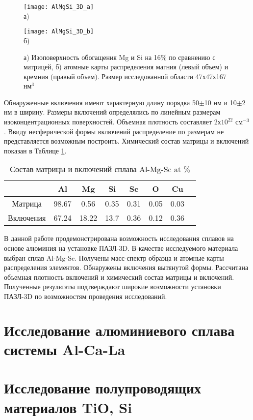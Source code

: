 \begin{figure}[htbp]
	\begin{minipage}[b][][b]{0.49\textwidth}\centering
		\texttt{[image: AlMgSi\_3D\_a]} \\ а)
	\end{minipage}
	\begin{minipage}[b][][b]{0.49\textwidth}\centering
		\texttt{[image: AlMgSi\_3D\_b]} \\ б)
	\end{minipage}
	\caption{а) Изоповерхность обогащения Mg и Si на 16$\%$ по сравнению с матрицей, б) атомные карты распределения магния (левый объем) и кремния (правый объем). Размер исследованной области 47х47х167 нм$^3$}
	\label{fig:AlMgSi_3D}
\end{figure} 

Обнаруженные включения имеют характерную длину порядка 50$\pm$10 нм и 10$\pm$2 нм в ширину. Размеры включений определялись по линейным размерам изоконцентрационных поверхностей. Объемная плотность составляет 2х$10^{22}$ см$^{-3}$. Ввиду несферической формы включений распределение по размерам не представляется возможным построить. Химический состав матрицы и включений показан в Таблице \cref{tab:AlMgSi_table}.

\begin{table} [htbp]
	\centering
		\caption{Состав матрицы и включений сплава Al-Mg-Sc at $\%$}%
		\label{tab:AlMgSi_table}%
		\begin{SingleSpace}
			\begin{tabular}{| c | c | c | c | c | c | c | c |}
				\hline
				  			& Al      & Mg     & Si    & Sc     & O     & Cu     \\ \hline
				Матрица     & 98.67   & 0.56   & 0.35  & 0.31   & 0.05  & 0.03   \\ \hline
				Включения   & 67.24   & 18.22  & 13.7  & 0.36   & 0.12  & 0.36   \\ \hline				
			\end{tabular}%
		\end{SingleSpace}
\end{table}

В данной работе продемонстрирована возможность исследования сплавов на основе алюминия на установке ПАЗЛ-3D. В качестве исследуемого материала выбран сплав Al-Mg-Sc. Получены масс-спектр образца и атомные карты распределения элементов. Обнаружены включения вытянутой формы. Рассчитана объемная плотность включений и химический состав матрицы и включений. Полученные результаты подтверждают широкие возможности установки ПАЗЛ-3D по возможностям проведения исследований.

\section{Исследование алюминиевого сплава системы Al-Ca-La}\label{sec:ch4/sect2}


\section{Исследование полупроводящих материалов TiO, Si}\label{sec:ch4/sect3}